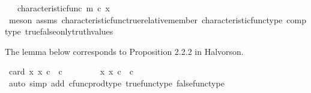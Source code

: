 \begin{isabellebody}
\ \ \ {\isachardoublequoteopen}characteristic{\isacharunderscore}{\kern0pt}func\ m\ {\isasymcirc}\isactrlsub c\ x\ {\isacharequal}{\kern0pt}\ {\isasymf}{\isachardoublequoteclose}\isanewline
%
\isadelimproof
\ \ %
\endisadelimproof
%
\isatagproof
{}\isamarkupfalse%
\ {\isacharparenleft}{\kern0pt}meson\ assms\ characteristic{\isacharunderscore}{\kern0pt}func{\isacharunderscore}{\kern0pt}true{\isacharunderscore}{\kern0pt}relative{\isacharunderscore}{\kern0pt}member\ characteristic{\isacharunderscore}{\kern0pt}func{\isacharunderscore}{\kern0pt}type\ comp{\isacharunderscore}{\kern0pt}type\ true{\isacharunderscore}{\kern0pt}false{\isacharunderscore}{\kern0pt}only{\isacharunderscore}{\kern0pt}truth{\isacharunderscore}{\kern0pt}values{\isacharparenright}{\kern0pt}%
\endisatagproof
{\isafoldproof}%
%
\isadelimproof
%
\endisadelimproof
%
\begin{isamarkuptext}%
The lemma below corresponds to Proposition 2.2.2 in Halvorson.%
\end{isamarkuptext}\isamarkuptrue%
\isamarkupfalse%
\ {\isachardoublequoteopen}card\ {\isacharbraceleft}{\kern0pt}x{\isachardot}{\kern0pt}\ x\ {\isasymin}\isactrlsub c\ {\isasymOmega}\ {\isasymtimes}\isactrlsub c\ {\isasymOmega}{\isacharbraceright}{\kern0pt}\ {\isacharequal}{\kern0pt}\ {}{\isachardoublequoteclose}\isanewline
%
\isadelimproof
%
\endisadelimproof
%
\isatagproof
{}\isamarkupfalse%
\ {\isacharminus}{\kern0pt}\isanewline
\ \ \isamarkupfalse%
\ {\isachardoublequoteopen}{\isacharbraceleft}{\kern0pt}x{\isachardot}{\kern0pt}\ x\ {\isasymin}\isactrlsub c\ {\isasymOmega}\ {\isasymtimes}\isactrlsub c\ {\isasymOmega}{\isacharbraceright}{\kern0pt}\ {\isacharequal}{\kern0pt}\ {\isacharbraceleft}{\kern0pt}{\isasymlangle}{\isasymt}{\isacharcomma}{\kern0pt}{\isasymt}{\isasymrangle}{\isacharcomma}{\kern0pt}\ {\isasymlangle}{\isasymt}{\isacharcomma}{\kern0pt}{\isasymf}{\isasymrangle}{\isacharcomma}{\kern0pt}\ {\isasymlangle}{\isasymf}{\isacharcomma}{\kern0pt}{\isasymt}{\isasymrangle}{\isacharcomma}{\kern0pt}\ {\isasymlangle}{\isasymf}{\isacharcomma}{\kern0pt}{\isasymf}{\isasymrangle}{\isacharbraceright}{\kern0pt}{\isachardoublequoteclose}\isanewline
\ \ \ \ \isamarkupfalse%
\ {\isacharparenleft}{\kern0pt}auto\ simp\ add{\isacharcolon}{\kern0pt}\ cfunc{\isacharunderscore}{\kern0pt}prod{\isacharunderscore}{\kern0pt}type\ true{\isacharunderscore}{\kern0pt}func{\isacharunderscore}{\kern0pt}type\ false{\isacharunderscore}{\kern0pt}func{\isacharunderscore}{\kern0pt}type{\isacharcomma}{\kern0pt}\isanewline

\end{isabellebody}
